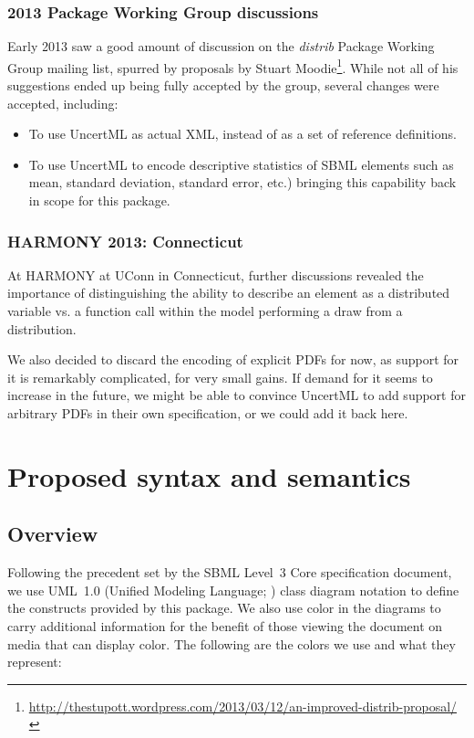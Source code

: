 \documentclass[draftspec]{sbmlpkgspec}
\newcommand{\distribshort}{\emph{distrib}\xspace}
\begin{document}
\subsubsection{2013 Package Working Group discussions}

Early 2013 saw a good amount of discussion on the \distribshort Package Working Group mailing list, spurred by proposals by Stuart Moodie\footnote{\url{http://thestupott.wordpress.com/2013/03/12/an-improved-distrib-proposal/}}.  While not all of his suggestions ended up being fully accepted by the group, several changes were accepted, including:

\begin{itemize}
\item To use UncertML as actual XML, instead of as a set of reference definitions.
\item To use UncertML to encode descriptive statistics of SBML elements such as mean, standard deviation, standard error, etc.) bringing this capability back in scope for this package.
\end{itemize}


\subsubsection{HARMONY 2013: Connecticut}

At HARMONY at UConn in Connecticut, further discussions revealed the importance of distinguishing the ability to describe an element as a distributed variable vs. a function call within the model performing a draw from a distribution.

We also decided to discard the encoding of explicit PDFs for now, as support for it is remarkably complicated, for very small gains.  If demand for it seems to increase in the future, we might be able to convince UncertML to add support for arbitrary PDFs in their own specification, or we could add it back here.


\section{Proposed syntax and semantics}

\subsection{Overview}

Following the precedent set by the SBML Level~3 Core specification
document, we use UML~1.0 (Unified Modeling Language;
\citealt{eriksson:1998,oestereich:1999}) class diagram notation to
define the constructs provided by this package.  We also use color in
the diagrams to carry additional information for the benefit of those
viewing the document on media that can display color.  The following are
the colors we use and what they represent:
\end{document}
